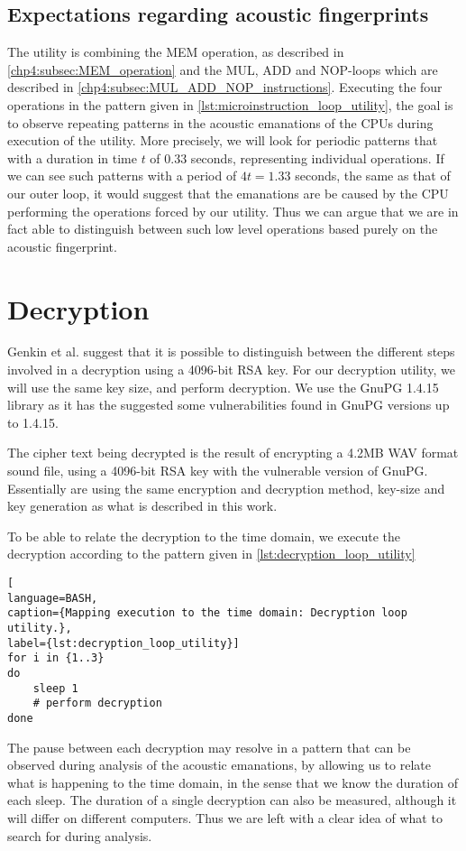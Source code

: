 \subsection{Expectations regarding acoustic fingerprints}
The utility is combining the MEM operation, as described in \autoref{chp4:subsec:MEM_operation} and the MUL, ADD and NOP-loops which are described in \autoref{chp4:subsec:MUL_ADD_NOP_instructions}.
Executing the four operations in the pattern given in \autoref{lst:microinstruction_loop_utility}, the goal is to observe repeating patterns in the acoustic emanations of the CPUs during execution of the utility.
More precisely, we will look for periodic patterns that with a duration in time \(t\) of \(0.33\) seconds, representing individual operations. 
If we can see such patterns with a period of \(4t = 1.33\) seconds, the same as that of our outer loop, it would suggest that the emanations are be caused by the CPU performing the operations forced by our utility.
Thus we can argue that we are in fact able to distinguish between such low level operations based purely on the acoustic fingerprint. 



\section{Decryption}\label{chp4:sec:decryption}
Genkin et al. suggest that it is possible to distinguish between the different steps involved in a decryption using a 4096-bit RSA key.
For our decryption utility, we will use the same key size, and perform decryption. 
We use the GnuPG 1.4.15~\cite{url:GnuPG_1.4.15} library as it has the suggested some vulnerabilities found in GnuPG versions up to 1.4.15\cite{DBLP:conf/crypto/GenkinST14}. 

The cipher text being decrypted is the result of encrypting a 4.2MB WAV format sound file, using a 4096-bit RSA key with the vulnerable version of GnuPG.
Essentially are using the same encryption and decryption method, key-size and key generation as what is described in this work. 

To be able to relate the decryption to the time domain, we execute the decryption according to the pattern given in \autoref{lst:decryption_loop_utility}

\begin{lstlisting}[
language=BASH, 
caption={Mapping execution to the time domain: Decryption loop utility.}, 
label={lst:decryption_loop_utility}]
for i in {1..3}
do
    sleep 1
    # perform decryption
done
\end{lstlisting}

The pause between each decryption may resolve in a pattern that can be observed during analysis of the acoustic emanations, by allowing us to relate what is happening to the time domain, in the sense that we know the duration of each sleep.
The duration of a single decryption can also be measured, although it will differ on different computers.
Thus we are left with a clear idea of what to search for during analysis.
